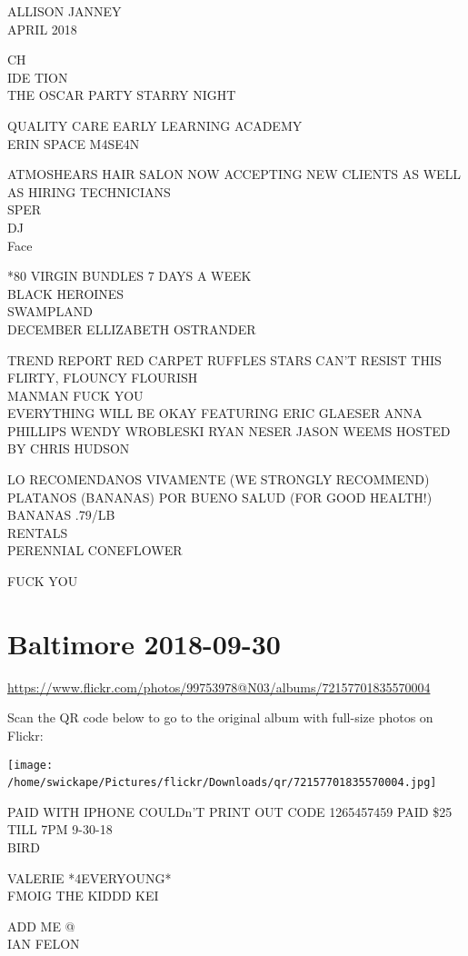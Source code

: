 \documentclass[10pt,letterpaper]{article}
\begin{document}
ALLISON JANNEY\\
APRIL 2018

CH\\
IDE TION\\
THE OSCAR PARTY STARRY NIGHT

QUALITY CARE EARLY LEARNING ACADEMY\\
ERIN SPACE M4SE4N

ATMOSHEARS HAIR SALON NOW ACCEPTING NEW CLIENTS AS WELL AS HIRING TECHNICIANS\\
SPER\\
DJ\\
Face

*80 VIRGIN BUNDLES 7 DAYS A WEEK\\
BLACK HEROINES\\
SWAMPLAND\\
DECEMBER ELLIZABETH OSTRANDER

TREND REPORT RED CARPET RUFFLES STARS CAN'T RESIST THIS FLIRTY, FLOUNCY FLOURISH\\
MANMAN FUCK YOU\\
EVERYTHING WILL BE OKAY FEATURING ERIC GLAESER ANNA PHILLIPS WENDY WROBLESKI RYAN NESER JASON WEEMS HOSTED BY CHRIS HUDSON

LO RECOMENDANOS VIVAMENTE (WE STRONGLY RECOMMEND) PLATANOS (BANANAS) POR BUENO SALUD (FOR GOOD HEALTH!) BANANAS .79/LB\\
RENTALS\\
PERENNIAL CONEFLOWER

FUCK YOU
\

\section*{Baltimore 2018-09-30}

\url{https://www.flickr.com/photos/99753978@N03/albums/72157701835570004}

Scan the QR code below to go to the original album with full-size photos on Flickr:

\texttt{[image: /home/swickape/Pictures/flickr/Downloads/qr/72157701835570004.jpg]}
\

PAID WITH IPHONE COULDn'T PRINT OUT CODE 1265457459 PAID \$25 TILL 7PM 9{-}30{-}18\\
BIRD

VALERIE *4EVERYOUNG*\\
FMOIG THE KIDDD KEI

ADD ME @\\
IAN FELON
\end{document}
